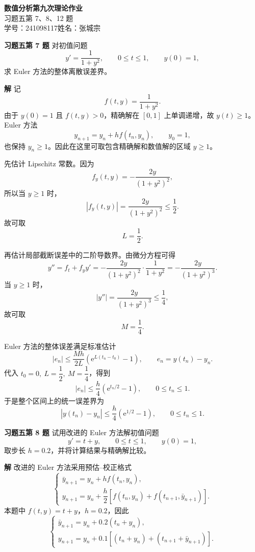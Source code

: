 \documentclass[UTF8,a4paper,11pt]{ctexart}
\newcommand{\ee}{\mathrm{e}}
\begin{document}
\begin{center}
  {\LARGE\bfseries 数值分析\quad 第九次理论作业}\\[6pt]
  {\large 习题五第 7、8、12 题}\\[4pt]
  {\normalsize 学号：241098117\quad 姓名：张城宗}
\end{center}

\bigskip

\noindent\textbf{习题五\quad 第 7 题}\quad
对初值问题
\[
  y'=\frac{1}{1+y^2},\qquad 0\le t\le 1,\qquad y(0)=1,
\]
求 Euler 方法的整体离散误差界。

\medskip
\noindent\textbf{解}\quad
记
\[
  f(t,y)=\frac{1}{1+y^2}.
\]
由于 $y(0)=1$ 且 $f(t,y)>0$，精确解在 $[0,1]$ 上单调递增，故 $y(t)\ge 1$。Euler 方法
\[
  y_{n+1}=y_n+h f(t_n,y_n),\qquad y_0=1,
\]
也保持 $y_n\ge 1$。因此在这里可取包含精确解和数值解的区域 $y\ge 1$。

先估计 Lipschitz 常数。因为
\[
  f_y(t,y)=-\frac{2y}{(1+y^2)^2},
\]
所以当 $y\ge 1$ 时，
\[
  |f_y(t,y)|=\frac{2y}{(1+y^2)^2}\le \frac12.
\]
故可取
\[
  L=\frac12.
\]

再估计局部截断误差中的二阶导数界。由微分方程可得
\[
  y''=f_t+f_y y'
      =-\frac{2y}{(1+y^2)^2}\cdot\frac{1}{1+y^2}
      =-\frac{2y}{(1+y^2)^3}.
\]
当 $y\ge 1$ 时，
\[
  |y''|=\frac{2y}{(1+y^2)^3}\le \frac14,
\]
故可取
\[
  M=\frac14.
\]

Euler 方法的整体误差满足标准估计
\[
  |e_n|
  \le \frac{Mh}{2L}\left(\ee^{L(t_n-t_0)}-1\right),
  \qquad e_n=y(t_n)-y_n.
\]
代入 $t_0=0,\ L=\dfrac12,\ M=\dfrac14$，得到
\[
  |e_n|
  \le \frac{h}{4}\left(\ee^{t_n/2}-1\right),
  \qquad 0\le t_n\le 1.
\]
于是整个区间上的统一误差界为
\[
  \boxed{
    |y(t_n)-y_n|
    \le \frac{h}{4}\left(\ee^{1/2}-1\right),
    \qquad 0\le t_n\le 1.}
\]

\bigskip\bigskip

\noindent\textbf{习题五\quad 第 8 题}\quad
试用改进的 Euler 方法解初值问题
\[
  y'=t+y,\qquad 0\le t\le 1,\qquad y(0)=1,
\]
取步长 $h=0.2$，并将计算结果与精确解比较。

\medskip
\noindent\textbf{解}\quad
改进的 Euler 方法采用预估--校正格式
\[
\begin{cases}
  \bar y_{n+1}=y_n+h f(t_n,y_n),\\[1mm]
  y_{n+1}=y_n+\dfrac h2
  \left[f(t_n,y_n)+f(t_{n+1},\bar y_{n+1})\right].
\end{cases}
\]
本题中 $f(t,y)=t+y$，$h=0.2$，因此
\[
\begin{cases}
  \bar y_{n+1}=y_n+0.2(t_n+y_n),\\[1mm]
  y_{n+1}=y_n+0.1\left[(t_n+y_n)+(t_{n+1}+\bar y_{n+1})\right].
\end{cases}
\]
\end{document}

